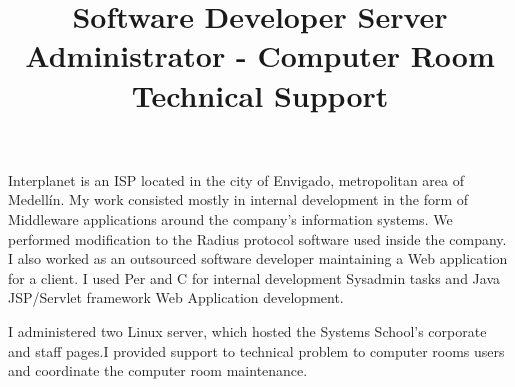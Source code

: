 \begin{resume}
\title{\textbf{Software Developer}
}
\begin{position}
Interplanet is an  ISP located in the city of Envigado, metropolitan area of Medell\'{i}n.
My work consisted mostly  in internal development in the form of
Middleware applications  around the company's information systems.
We performed modification to the Radius protocol software used inside the company.
I also worked as an outsourced software developer maintaining a Web application
for a client.  I used Per and C for internal development Sysadmin
tasks and  Java JSP/Servlet framework Web Application development.
\end{position}
\newline
\newline
\newline

\title{\textbf{Server Administrator - Computer Room Technical Support}
}
\begin{position}
I administered two Linux server, which hosted the Systems School's
corporate and staff pages.I provided support to technical problem 
to computer rooms users and coordinate the computer room maintenance.
\end{position}
\newline







\end{resume}
